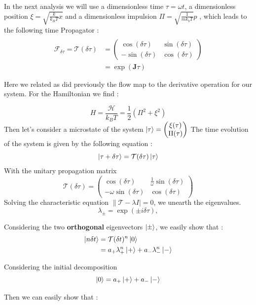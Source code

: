 \documentclass[ansiapaper]{report}
\begin{document}
\begin{multicols}{3}
	In the next analysis we will use a dimensionless time $\tau = \omega t$,  a dimensionless position $\xi = \sqrt{\frac{k}{k_BT}x}$ and a dimensionless impulsion $\Pi = \sqrt{\frac{1}{mk_bT}}p$ , which leads to the following time Propagator :
	\begin{align*}
		\\ \mathcal{F}_{\delta \tau} = \mathcal{T}(\delta \tau) &=  \left(\begin{array}{cc}
				\cos(\delta \tau)   & \sin(\delta \tau) \\
				- \sin(\delta \tau) & \cos(\delta \tau)
			\end{array}
		\right)
		\\ &=  \exp(\textbf{J} \tau)
	\end{align*}

	Here we related as did previously the flow map to the derivative operation for our system.
	For the Hamiltonian we find :

	$$ H = \frac{\mathcal{H}}{k_BT} = \frac{1}{2}(\Pi^2 + \xi^2)$$ Then let's consider a microstate of the system $\ket{\tau} = \begin{pmatrix}
			\xi(\tau) \\
			\Pi(\tau)
		\end{pmatrix}$
	The time evolution of the system is given by the following equation :
	$$ \ket{\tau + \delta \tau} = \mathcal{T}(\delta \tau) \ket{\tau}$$
	With the unitary propagation matrix $$\mathcal{T}(\delta \tau) = \begin{pmatrix}
			\cos(\delta \tau)         & \frac{1}{\omega}\sin(\delta \tau) \\
			-\omega \sin(\delta \tau) & \cos(\delta \tau)
		\end{pmatrix}$$
	Solving the characteristic equation $\lVert \mathcal{T} - \lambda I\rvert = 0$, we unearth the eigenvalues.
	$$ \lambda_\pm = \exp(\pm i \delta \tau), $$

	Considering the two \textbf{orthogonal}  eigenvectors $\ket{\pm}$, we easily show that :
	\begin{align*}
		\ket{n \delta t} & = \mathcal{T}(\delta t)^n \ket{0}                   \\
		                 & = a_+ \lambda_+^n \ket{+} + a_- \lambda_-^n \ket{-} \\
	\end{align*}

	Considering the initial decomposition $$ \ket{0} = a_+ \ket{+} + a_- \ket{-}$$

	Then we can easily show that :


\end{multicols}
\end{document}
